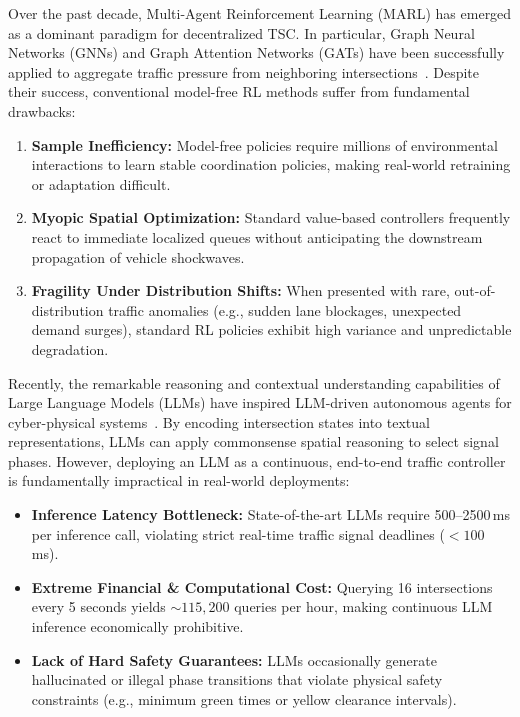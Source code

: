 \documentclass[11pt,a4paper,twocolumn]{article}
\begin{document}
Over the past decade, Multi-Agent Reinforcement Learning (MARL) has emerged as a dominant paradigm for decentralized TSC. In particular, Graph Neural Networks (GNNs) and Graph Attention Networks (GATs) have been successfully applied to aggregate traffic pressure from neighboring intersections~\cite{velickovic2018graph,wei2019colight,brody2022gatv2}. Despite their success, conventional model-free RL methods suffer from fundamental drawbacks:
\begin{enumerate}
    \item \textbf{Sample Inefficiency:} Model-free policies require millions of environmental interactions to learn stable coordination policies, making real-world retraining or adaptation difficult.
    \item \textbf{Myopic Spatial Optimization:} Standard value-based controllers frequently react to immediate localized queues without anticipating the downstream propagation of vehicle shockwaves.
    \item \textbf{Fragility Under Distribution Shifts:} When presented with rare, out-of-distribution traffic anomalies (e.g., sudden lane blockages, unexpected demand surges), standard RL policies exhibit high variance and unpredictable degradation.
\end{enumerate}

Recently, the remarkable reasoning and contextual understanding capabilities of Large Language Models (LLMs) have inspired LLM-driven autonomous agents for cyber-physical systems~\cite{wang2024survey,lai2024llmlight}. By encoding intersection states into textual representations, LLMs can apply commonsense spatial reasoning to select signal phases. However, deploying an LLM as a continuous, end-to-end traffic controller is fundamentally impractical in real-world deployments:
\begin{itemize}
    \item \textbf{Inference Latency Bottleneck:} State-of-the-art LLMs require 500--2500\,ms per inference call, violating strict real-time traffic signal deadlines ($<100$\,ms).
    \item \textbf{Extreme Financial \& Computational Cost:} Querying 16 intersections every 5 seconds yields $\sim 115,200$ queries per hour, making continuous LLM inference economically prohibitive.
    \item \textbf{Lack of Hard Safety Guarantees:} LLMs occasionally generate hallucinated or illegal phase transitions that violate physical safety constraints (e.g., minimum green times or yellow clearance intervals).
\end{itemize}
\end{document}
